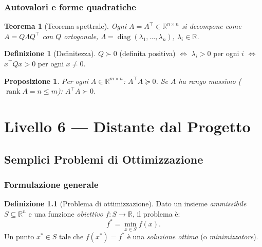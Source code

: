 \documentclass[11pt, a4paper, twoside]{book}
\theoremstyle{definition}
\newtheorem{defn}{Definizione}[chapter]
\theoremstyle{plain}
\newtheorem{thm}{Teorema}[chapter]
\newtheorem{prop}{Proposizione}[chapter]
\theoremstyle{remark}
\DeclareMathOperator{\rank}{rank}
\DeclareMathOperator{\diag}{diag}
\newcommand{\R}{\mathbb{R}}
\begin{document}
\section{Autovalori e forme quadratiche}

\begin{thm}[Teorema spettrale]
Ogni $A = A^\top \in \R^{n \times n}$ si decompone come $A = Q\Lambda Q^\top$ con $Q$ ortogonale, $\Lambda = \diag(\lambda_1, \ldots, \lambda_n)$, $\lambda_i \in \R$.
\end{thm}

\begin{defn}[Definitezza]
$Q \succ 0$ (definita positiva) $\Leftrightarrow$ $\lambda_i > 0$ per ogni $i$ $\Leftrightarrow$ $x^\top Qx > 0$ per ogni $x \neq 0$.
\end{defn}

\begin{prop}
Per ogni $A \in \R^{m \times n}$: $A^\top A \succeq 0$. Se $A$ ha rango massimo ($\rank A = n \leq m$): $A^\top A \succ 0$.
\end{prop}


\part{Livello 6 --- Distante dal Progetto}
\label{part:L6}

\chapter{Semplici Problemi di Ottimizzazione}

\section{Formulazione generale}

\begin{defn}[Problema di ottimizzazione]
Dato un insieme \emph{ammissibile} $S \subseteq \R^n$ e una funzione \emph{obiettivo} $f: S \to \R$, il problema è:
\[
  f^* = \min_{x \in S} f(x).
\]
Un punto $x^* \in S$ tale che $f(x^*) = f^*$ è una \emph{soluzione ottima} (o \emph{minimizzatore}).
\end{defn}
\end{document}
